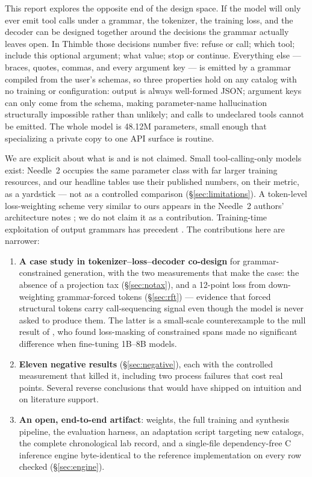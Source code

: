 \documentclass[10pt]{article}
\newcommand{\thimble}{Thimble}
\newcommand{\needle}{Needle~2}
\begin{document}
This report explores the opposite end of the design space. If the model will
only ever emit tool calls under a grammar, the tokenizer, the training loss,
and the decoder can be designed together around the decisions the grammar
actually leaves open. In \thimble{} those decisions number five: refuse or
call; which tool; include this optional argument; what value; stop or
continue. Everything else --- braces, quotes, commas, and every argument key
--- is emitted by a grammar compiled from the user's schemas, so three
properties hold on any catalog with no training or configuration: output is
always well-formed JSON; argument keys can only come from the schema, making
parameter-name hallucination structurally impossible rather than unlikely; and
calls to undeclared tools cannot be emitted. The whole model is 48.12M
parameters, small enough that specializing a private copy to one API surface
is routine.

We are explicit about what is and is not claimed. Small tool-calling-only
models exist: \needle{} \citep{needle2,san} occupies the same parameter class
with far larger training resources, and our headline tables use their
published numbers, on their metric, as a yardstick --- not as a controlled
comparison (\S\ref{sec:limitations}). A token-level loss-weighting scheme very
similar to ours appears in the \needle{} authors' architecture notes
\citep{san}; we do not claim it as a contribution. Training-time exploitation
of output grammars has precedent \citep{graft,slgm,ailem2021}. The
contributions here are narrower:

\begin{enumerate}
  \item \textbf{A case study in tokenizer--loss--decoder co-design} for
  grammar-constrained generation, with the two measurements that make the case:
  the absence of a projection tax (\S\ref{sec:notax}), and a 12-point loss from
  down-weighting grammar-forced tokens (\S\ref{sec:rft}) --- evidence that
  forced structural tokens carry call-sequencing signal even though the model
  is never asked to produce them. The latter is a small-scale counterexample to
  the null result of \citet{gan2025}, who found loss-masking of constrained
  spans made no significant difference when fine-tuning 1B--8B models.
  \item \textbf{Eleven negative results} (\S\ref{sec:negative}), each with the
  controlled measurement that killed it, including two process failures that
  cost real points. Several reverse conclusions that would have shipped on
  intuition and on literature support.
  \item \textbf{An open, end-to-end artifact}: weights, the full training and
  synthesis pipeline, the evaluation harness, an adaptation script targeting
  new catalogs, the complete chronological lab record, and a single-file
  dependency-free C inference engine byte-identical to the reference
  implementation on every row checked (\S\ref{sec:engine}).
\end{enumerate}
\end{document}
